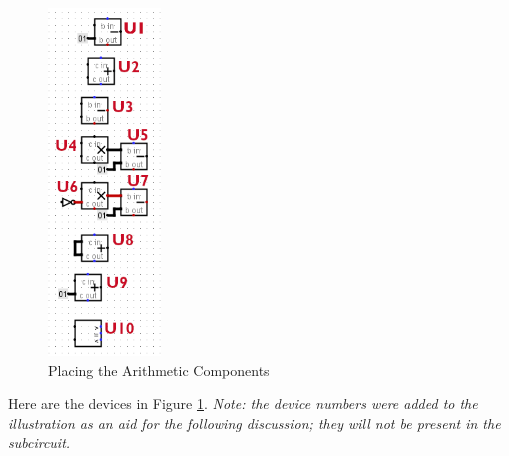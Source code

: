 \begin{figure}[H]
	\centering
	\includegraphics[width=3cm]{gfx/arith-01}
	\caption{Placing the Arithmetic Components}
	\label{fig:arith-01}
\end{figure}

Here are the devices in Figure \ref{fig:arith-01}. \textit{Note: the device numbers were added to the illustration as an aid for the following discussion; they will not be present in the \LE subcircuit.}

